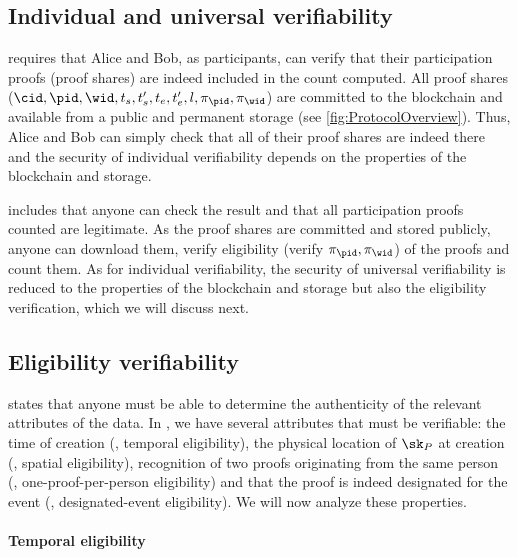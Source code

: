 \subsection{Individual and universal verifiability}%
\label{analysis-individual}%
\label{analysis-universal}

 requires that Alice and Bob, as participants, can verify that their participation proofs (\ie proof shares) are indeed included in the count computed.
All proof shares (\ie \(\cid, \pid, \wid, t_s, t_s', t_e, t_e', l, \pi_\pid, \pi_{\wid}\)) are committed to the blockchain and available from a public and permanent storage (see \cref{fig:ProtocolOverview}).
Thus, Alice and Bob can simply check that all of their proof shares are indeed there and the security of individual verifiability depends on the properties of the blockchain and storage.

  includes that anyone can check the result and that all participation proofs counted are legitimate.
As the proof shares are committed and stored publicly, anyone can
download them, verify eligibility (\ie verify \(\pi_\pid,
\pi_{\wid}\)) of the proofs and count them.
As for individual verifiability, the security of universal verifiability is reduced to the properties of the blockchain and storage but also the eligibility verification, which we will discuss next.

\subsection{Eligibility verifiability}%
\label{analysis-eligibility}

 states that anyone must be able to determine the authenticity of the relevant attributes of the data.
In \PRIVO, we have several attributes that must be verifiable: the time of creation (\ie, temporal eligibility), the physical location of \(\sk_P\) at creation (\ie, spatial eligibility), recognition of two proofs originating from the same person (\ie, one-proof-per-person eligibility) and that the proof is indeed designated for the event (\ie, designated-event eligibility).
We will now analyze these properties.

\paragraph{Temporal eligibility}%
\label{analysis-temporal}

